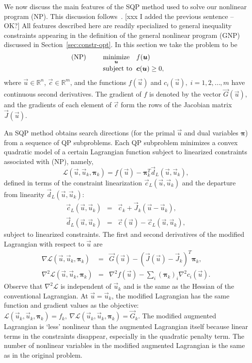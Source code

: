 \documentclass[twocolumn,numbook]{svjour3}          %
\makeatletter
\def\u{{\vec u}}
\def\c{{\vec c}}
\def\d{{\vec d}}
\def\g{{\vec{G}}}
\def\bpi{{\pmb{\pi}}}%
\def\J{{\vec J}}
\def\disp{\displaystyle}
\def\grad{\nabla}
\def\Hess{\nabla^2}
\def\minim{\mathop{\hbox{\rm minimize}}}
\def\minimize#1{{\displaystyle\minim_{#1}}}
\def\Lscr{{\mathcal L}}
\def\subject{\mbox{\rm subject to}}
\def\T{^T\!}
\def\fk{f_k}
\def\gk{\g_k}
\def\ck{\c_k}
\def\Jk{\J_k}
\def\cL{\c_{\scriptscriptstyle L}} %
\def\dL{\d_{\scriptscriptstyle L}} %
\def\problem#1#2#3#4{%
   {\begin{tabular*}{0.47\textwidth}
    {@{}l@{\extracolsep{\fill}}l@{\extracolsep{6pt}}l@{\extracolsep{\fill}}c@{}}
      #1 & $\minimize{#2}$ & $#3$ & $ $ \\[5pt]
         & $\subject$      & $#4$ & $ $
    \end{tabular*}}}
\makeatother
\begin{document}

We now discuss the main features of the SQP method used to solve our
nonlinear program (NP). This discussion follows~\cite{SNOPT}. [xxx I added the previous sentence -- OK?] All features described here are readily 
specialized to general inequality constraints appearing in the 
definition of the general nonlinear program (GNP) discussed in 
Section~\ref{sec:constr-opt}. In this section we take the problem to be
$$
   \problem{(NP)}{\u}{f(\u)}{\c(\u) \ge 0,}
$$
where $\u \in \mathbb R^n$, $\c \in \mathbb R^m$, and the functions $f(\u)$ and $c_i(\u), \; i=1,2,\ldots,m$
have continuous second derivatives. The gradient of $f$ is denoted
by the vector $\g(\u)$, and the gradients of each element of $\c$ form
the rows of the Jacobian matrix $\J(\u)$.

 An SQP method obtains search directions (for the primal $\u$ and dual variables $\bpi$) from a sequence of QP subproblems.  
 Each QP subproblem minimizes a convex quadratic
model of a certain Lagrangian function subject to
linearized constraints associated with (NP), namely,
\begin{equation}                                 \label{eqn-def-ML}
        \Lscr(\u,\u_k,\bpi_k) = f(\u) - \bpi_k^T \dL(\u,\u_k),
\end{equation}
defined in terms of the constraint linearization $\cL(\u,\u_k)$
and the departure from linearity $\dL(\u,\u_k)$:
\begin{eqnarray*}
        \cL(\u,\u_k) &=& \ck  + \Jk(\u - \u_k),
     \\ \dL(\u,\u_k) &=& \c(\u) - \cL(\u,\u_k),
\end{eqnarray*}
subject to linearized constraints.  
The first and second derivatives of the modified Lagrangian with
respect to $\u$ are
\begin{eqnarray*}
        \grad\Lscr(\u,\u_k,\bpi_k) &=& \g(\u) - (\J(\u) - \Jk)\T \bpi_k, \\[3pt]
        \Hess\Lscr(\u,\u_k,\bpi_k) &=& \disp \Hess f(\u)
                                           - \sum_i (\bpi_k)_i \Hess c_i(\u).
\end{eqnarray*}
Observe that $\Hess\Lscr$ is independent of $\u_k$
and is the same as the Hessian of the conventional Lagrangian.
At $\u = \u_k$, the modified Lagrangian has the same function and
gradient values as the objective:
$
           \Lscr(\u_k,\u_k,\bpi_k) = \fk, \ %
     \grad \Lscr(\u_k,\u_k,\bpi_k) = \gk.
$
The modified augmented Lagrangian is `less' nonlinear than the augmented Lagrangian itself
because linear terms in the constraints disappear, especially in the quadratic penalty term.
The number of nonlinear variables in the modified augmented Lagrangian is the same as in the original problem.
\end{document}
